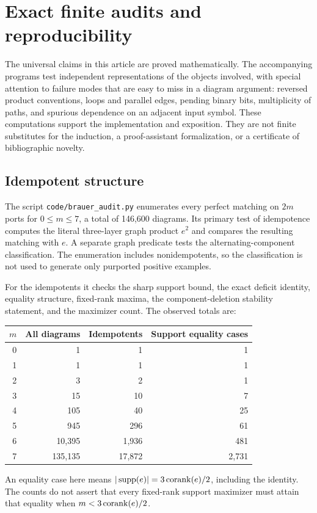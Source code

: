\section{Exact finite audits and reproducibility}
\label{btc:verify:section}

The universal claims in this article are proved mathematically.
The accompanying programs test independent representations of the
objects involved, with special attention to failure modes that are
easy to miss in a diagram argument: reversed product conventions,
loops and parallel edges, pending binary bits, multiplicity of
paths, and spurious dependence on an adjacent input symbol.
These computations support the implementation and exposition.
They are not finite substitutes for the induction, a proof-assistant
formalization, or a certificate of bibliographic novelty.

\subsection{Idempotent structure}

The script \texttt{code/brauer\_audit.py} enumerates every perfect
matching on $2m$ ports for $0\le m\le7$, a total of 146,600
diagrams. Its primary test of idempotence computes the literal
three-layer graph product $e^2$ and compares the resulting matching
with $e$. A separate graph predicate tests the alternating-component
classification. The enumeration includes nonidempotents, so the
classification is not used to generate only purported positive
examples.

For the idempotents it checks the sharp support bound, the exact
deficit identity, equality structure, fixed-rank maxima, the
component-deletion stability statement, and the maximizer count.
The observed totals are:
\begin{center}
\begin{tabular}{rrrr}
\toprule
$m$ & All diagrams & Idempotents & Support equality cases\\
\midrule
0 & 1 & 1 & 1\\
1 & 1 & 1 & 1\\
2 & 3 & 2 & 1\\
3 & 15 & 10 & 7\\
4 & 105 & 40 & 25\\
5 & 945 & 296 & 61\\
6 & 10,395 & 1,936 & 481\\
7 & 135,135 & 17,872 & 2,731\\
\bottomrule
\end{tabular}
\end{center}
An equality case here means $|\operatorname{supp}(e)|=3\operatorname{corank}(e)/2$,
including the identity. The counts do not assert that every
fixed-rank support maximizer must attain that equality when
$m<3\operatorname{corank}(e)/2$.

